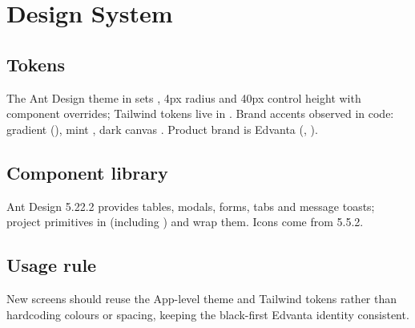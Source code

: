 \section{Design System}
\label{sec:design-system}

\subsection{Tokens}

The Ant Design theme in  sets , 4px radius and 40px control height with component overrides; Tailwind tokens live in . Brand accents observed in code: gradient  (), mint , dark canvas . Product brand is Edvanta (, ).

\subsection{Component library}

Ant Design 5.22.2 provides tables, modals, forms, tabs and message toasts; project primitives in  (including ) and  wrap them. Icons come from  5.5.2.

\subsection{Usage rule}

New screens should reuse the App-level theme and Tailwind tokens rather than hardcoding colours or spacing, keeping the black-first Edvanta identity consistent.
